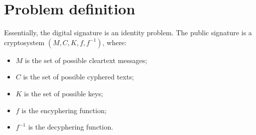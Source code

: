 \section{Problem definition}
Essentially, the digital signature is an identity problem.\newline
The public signature is a cryptosystem $(M, C, K, f, f^{-1})$, where:
\begin{itemize}
    \item $M$ is the set of possible cleartext messages;
    \item $C$ is the set of possible cyphered texts;
    \item $K$ is the set of possible keys;
    \item $f$ is the encyphering function;
    \item $f^{-1}$ is the decyphering function.
\end{itemize}

